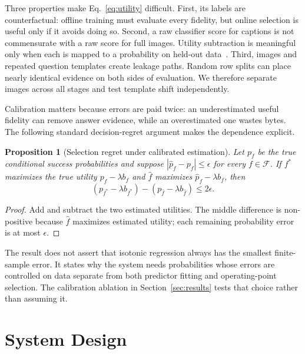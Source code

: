 \documentclass[10pt,conference]{IEEEtran}
\newcommand{\fset}{\mathcal{F}}
\newtheorem{proposition}{Proposition}
\begin{document}
Three properties make Eq.~\ref{eq:utility} difficult. First, its labels are
counterfactual: offline training must evaluate every fidelity, but online
selection is useful only if it avoids doing so. Second, a raw classifier score
for captions is not commensurate with a raw score for full images. Utility
subtraction is meaningful only when each is mapped to a probability on held-out
data~\cite{guo2017calibrationmodernneuralnetworks,desai2020calibration}. Third,
images and repeated question templates create leakage paths. Random row splits
can place nearly identical evidence on both sides of evaluation. We therefore
separate images across all stages and test template shift independently.

Calibration matters because errors are paid twice: an underestimated useful
fidelity can remove answer evidence, while an overestimated one wastes bytes.
The following standard decision-regret argument makes the dependence explicit.

\begin{proposition}[Selection regret under calibrated estimation]
Let $p_f$ be the true conditional success probabilities and suppose
$|\widehat p_f-p_f|\leq\epsilon$ for every $f\in\fset$. If $f^*$ maximizes the
true utility $p_f-\lambda b_f$ and $\widehat f$ maximizes
$\widehat p_f-\lambda b_f$, then
\[
 (p_{f^*}-\lambda b_{f^*})-(p_{\widehat f}-\lambda b_{\widehat f})
 \leq 2\epsilon.
\]
\end{proposition}
\begin{proof}
Add and subtract the two estimated utilities. The middle difference is
non-positive because $\widehat f$ maximizes estimated utility; each remaining
probability error is at most $\epsilon$.
\end{proof}

The result does not assert that isotonic regression always has the smallest
finite-sample error. It states why the system needs probabilities whose errors
are controlled on data separate from both predictor fitting and operating-point
selection. The calibration ablation in Section~\ref{sec:results} tests that
choice rather than assuming it.

\section{System Design}
\label{sec:design}
\end{document}
